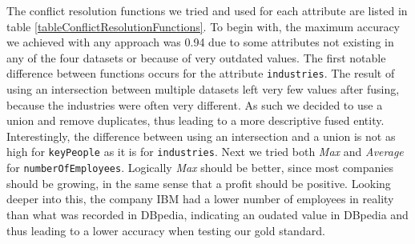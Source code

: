 The conflict resolution functions we tried and used for each attribute are listed in table \ref{tableConflictResolutionFunctions}. To begin with, the maximum accuracy we achieved with any approach was 0.94 due to some attributes not existing in any of the four datasets or because of very outdated values. The first notable difference between functions occurs for the attribute \texttt{industries}. The result of using an intersection between multiple datasets left very few values after fusing, because the industries were often very different. As such we decided to use a union and remove duplicates, thus leading to a more descriptive fused entity. Interestingly, the difference between using an intersection and a union is not as high for \texttt{keyPeople} as it is for \texttt{industries}. 
Next we tried both \textit{Max} and \textit{Average} for \texttt{numberOfEmployees}. Logically \textit{Max} should be better, since most companies should be growing, in the same sense that a profit should be positive. Looking deeper into this, the company IBM had a lower number of employees in reality than what was recorded in DBpedia, indicating an oudated value in DBpedia and thus leading to a lower accuracy when testing our gold standard. 



